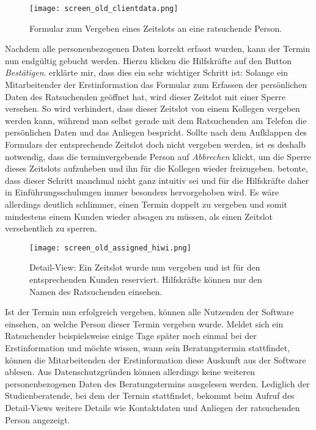 \begin{figure}[H]
    \caption{Formular zum Vergeben eines Zeitslots an eine ratsuchende Person.}
    \centering
    \texttt{[image: screen\_old\_clientdata.png]}
\end{figure}

Nachdem alle personenbezogenen Daten korrekt erfasst wurden, kann der Termin
nun endgültig gebucht werden. Hierzu klicken die Hilfskräfte auf den Button
\textit{Bestätigen}. \ipName erklärte mir, dass dies ein sehr wichtiger Schritt
ist: Solange ein Mitarbeitender der Erstinformation das Formular zum Erfassen
der persönlichen Daten des Ratsuchenden geöffnet hat, wird dieser Zeitslot mit
einer Sperre versehen. So wird verhindert, dass dieser Zeitslot von einem
Kollegen vergeben werden kann, während man selbst gerade mit dem Ratsuchenden
am Telefon die persönlichen Daten und das Anliegen bespricht. Sollte nach dem
Aufklappen des Formulars der entsprechende Zeitslot doch nicht vergeben werden,
ist es deshalb notwendig, dass die terminvergebende Person auf
\textit{Abbrechen} klickt, um die Sperre dieses Zeitslots aufzuheben und ihn
für die Kollegen wieder freizugeben. \ipName betonte, dass dieser Schritt
manchmal nicht ganz intuitiv sei und für die Hilfskräfte daher in
Einführungsschulungen immer besonders hervorgehoben wird. Es wäre allerdings
deutlich schlimmer, einen Termin doppelt zu vergeben und somit mindestens einem
Kunden wieder absagen zu müssen, als einen Zeitslot versehentlich zu sperren.

\begin{figure}[H]
    \caption{Detail-View: Ein Zeitslot wurde nun vergeben und ist für den entsprechenden Kunden reserviert. Hilfskräfte können nur den Namen des Ratsuchenden einsehen.}
    \centering
    \texttt{[image: screen\_old\_assigned\_hiwi.png]}
\end{figure}

Ist der Termin nun erfolgreich vergeben, können alle Nutzenden der Software
einsehen, an welche Person dieser Termin vergeben wurde. Meldet sich ein
Ratsuchender beispielsweise einige Tage später noch einmal bei der
Erstinformation und möchte wissen, wann sein Beratungstermin stattfindet,
können die Mitarbeitenden der Erstinformation diese Auskunft aus der Software
ablesen. Aus Datenschutzgründen können allerdings keine weiteren
personenbezogenen Daten des Beratungstermins ausgelesen werden. Lediglich der
Studienberatende, bei dem der Termin stattfindet, bekommt beim Aufruf des
Detail-Views weitere Details wie Kontaktdaten und Anliegen der ratsuchenden
Person angezeigt.

